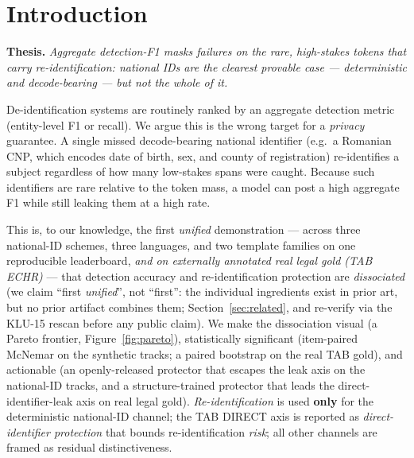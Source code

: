 \documentclass[11pt]{article}
\newcommand{\sotagate}{\textbf{[SOTA-CLAIM GATED on KLU-27: native-speaker + inter-annotator
agreement sign-off on \texttt{ro-realskeleton} must clear the \texttt{dev} tracks before any
``best/strongest/SOTA'' wording. Re-run the KLU-15 prior-art rescan before broadening the public
claim, which predates the 3-ID / legal / Track-C expansion.]}}
\begin{document}
\begin{abstract}
We separately report a \textbf{preliminary, in-progress} second mechanism --- a name-in-context
residual leak --- as corroborating evidence of \emph{residual distinctiveness} (not
re-identification), and frame the quasi-identifier-combination metric as future work. We release the
\texttt{kp-deid} protector and the analysis harness. \sotagate{} The synthetic real-skeleton results
are \texttt{config\_status=dev} (a finding, gated on KLU-27); the TAB direct-identifier results are on
real external gold and are citable within their stated scope (single board, single architecture,
TAB-EN-legal).
\end{abstract}

\section{Introduction}
\label{sec:intro}
\textbf{Thesis.} \emph{Aggregate detection-F1 masks failures on the rare, high-stakes tokens that
carry re-identification: national IDs are the clearest provable case --- deterministic and
decode-bearing --- but not the whole of it.}

De-identification systems are routinely ranked by an aggregate detection metric (entity-level F1 or
recall). We argue this is the wrong target for a \emph{privacy} guarantee. A single missed
decode-bearing national identifier (e.g.\ a Romanian CNP, which encodes date of birth, sex, and
county of registration) re-identifies a subject regardless of how many low-stakes spans were caught.
Because such identifiers are rare relative to the token mass, a model can post a high aggregate F1
while still leaking them at a high rate.

This is, to our knowledge, the first \emph{unified} demonstration --- across three national-ID
schemes, three languages, and two template families on one reproducible leaderboard, \emph{and on
externally annotated real legal gold (TAB ECHR)} --- that detection accuracy and re-identification
protection are \emph{dissociated} (we claim ``first \emph{unified}'', not ``first'': the individual
ingredients exist in prior art, but no prior artifact combines them; Section~\ref{sec:related}, and
re-verify via the KLU-15 rescan before any public claim). We make the dissociation visual (a Pareto
frontier, Figure~\ref{fig:pareto}), statistically significant (item-paired McNemar on the synthetic
tracks; a paired bootstrap on the real TAB gold), and actionable (an openly-released protector that
escapes the leak axis on the national-ID tracks, and a structure-trained protector that leads the
direct-identifier-leak axis on real legal gold). \emph{Re-identification} is used \textbf{only} for
the deterministic national-ID channel; the TAB DIRECT axis is reported as
\emph{direct-identifier protection} that bounds re-identification \emph{risk}; all other channels are
framed as residual distinctiveness.
\end{document}
